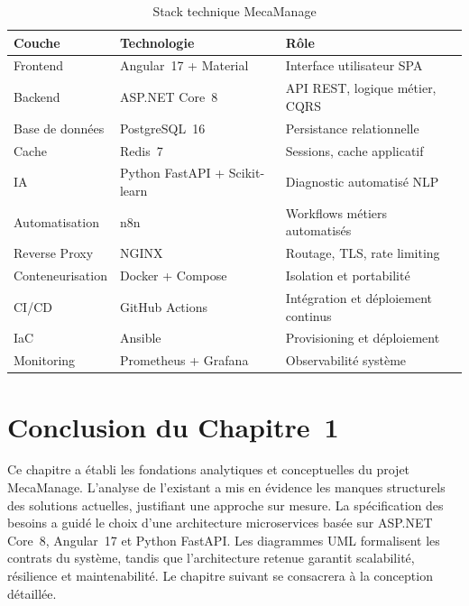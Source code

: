 \documentclass[12pt,a4paper]{report}
\begin{document}
\begin{table}[H]
\centering
\caption{Stack technique MecaManage}
\renewcommand{\arraystretch}{1.3}
\begin{tabularx}{\textwidth}{|l|l|X|}
\hline
\rowcolor{primary!20}
\textbf{Couche} & \textbf{Technologie} & \textbf{R\^{o}le} \\
\hline
Frontend & Angular~17 + Material & Interface utilisateur SPA \\
\hline
Backend & ASP.NET Core~8 & API REST, logique m\'{e}tier, CQRS \\
\hline
Base de donn\'{e}es & PostgreSQL~16 & Persistance relationnelle \\
\hline
Cache & Redis~7 & Sessions, cache applicatif \\
\hline
IA & Python FastAPI + Scikit-learn & Diagnostic automatis\'{e} NLP \\
\hline
Automatisation & n8n & Workflows m\'{e}tiers automatis\'{e}s \\
\hline
Reverse Proxy & NGINX & Routage, TLS, rate limiting \\
\hline
Conteneurisation & Docker + Compose & Isolation et portabilit\'{e} \\
\hline
CI/CD & GitHub Actions & Int\'{e}gration et d\'{e}ploiement continus \\
\hline
IaC & Ansible & Provisioning et d\'{e}ploiement \\
\hline
Monitoring & Prometheus + Grafana & Observabilit\'{e} syst\`{e}me \\
\hline
\end{tabularx}
\end{table}

\section*{Conclusion du Chapitre~1}

Ce chapitre a \'{e}tabli les fondations analytiques et conceptuelles
du projet MecaManage. L'analyse de l'existant a mis en \'{e}vidence
les manques structurels des solutions actuelles, justifiant une
approche sur mesure. La sp\'{e}cification des besoins a guid\'{e}
le choix d'une architecture microservices bas\'{e}e sur ASP.NET
Core~8, Angular~17 et Python FastAPI. Les diagrammes UML formalisent
les contrats du syst\`{e}me, tandis que l'architecture retenue
garantit scalabilit\'{e}, r\'{e}silience et maintenabilit\'{e}.
Le chapitre suivant se consacrera \`{a} la conception d\'{e}taill\'{e}e.
\end{document}
